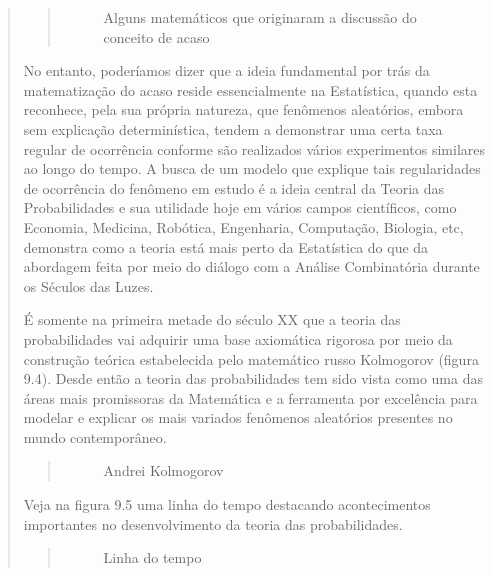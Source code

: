 \begin{quote}
\begin{quote}
\begin{figure}[H]
\noindent{}
\caption{Alguns matemáticos que originaram a discussão do conceito de acaso}\label{\detokenize{PE511-0:id3}}\end{figure}
\end{quote}

No entanto, poderíamos dizer que a ideia fundamental por trás da matematização do acaso reside essencialmente na Estatística, quando esta reconhece, pela sua própria natureza, que fenômenos aleatórios, embora sem explicação determinística, tendem a demonstrar uma certa taxa regular de ocorrência conforme são realizados vários experimentos similares ao longo do tempo. A busca de um modelo que explique tais regularidades de ocorrência do fenômeno em estudo é a ideia central da Teoria das Probabilidades e sua utilidade hoje em vários campos científicos, como Economia, Medicina, Robótica, Engenharia, Computação, Biologia, etc, demonstra como a teoria está mais perto da Estatística do que da abordagem feita por meio do diálogo com a Análise Combinatória durante os Séculos das Luzes.

É somente na primeira metade do século XX que a teoria das probabilidades vai adquirir uma base axiomática rigorosa por meio da construção teórica estabelecida pelo matemático russo Kolmogorov (figura 9.4). Desde então a teoria das probabilidades tem sido vista como uma das áreas mais promissoras da Matemática e a ferramenta por excelência para modelar e explicar os mais variados fenômenos aleatórios presentes no mundo contemporâneo.
\begin{quote}

\begin{figure}[H]
\centering
\capstart

\noindent{}
\caption{Andrei Kolmogorov}\label{\detokenize{PE511-0:id4}}\end{figure}
\end{quote}

Veja na figura 9.5 uma linha do tempo destacando acontecimentos importantes no desenvolvimento da teoria das probabilidades.
\begin{quote}

\begin{figure}[H]
\centering
\capstart

\noindent{}
\caption{Linha do tempo}\label{\detokenize{PE511-0:id5}}\end{figure}
\end{quote}
\end{quote}

